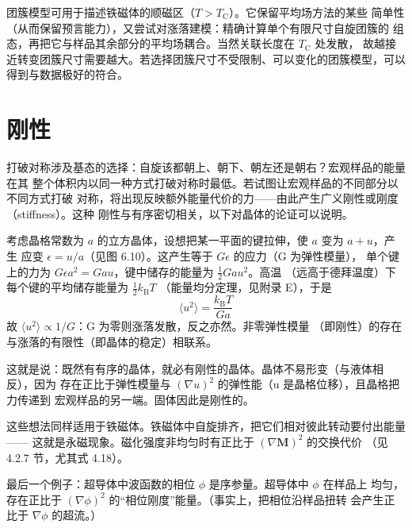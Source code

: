团簇模型可用于描述铁磁体的顺磁区（$T>T_{\mathrm{C}}$）。它保留平均场方法的某些
简单性（从而保留预言能力），又尝试对涨落建模：精确计算单个有限尺寸自旋团簇的
组态，再把它与样品其余部分的平均场耦合。当然关联长度在 $T_{\mathrm{C}}$ 处发散，
故越接近转变团簇尺寸需要越大。若选择团簇尺寸不受限制、可以变化的团簇模型，可以
得到与数据极好的符合。

\section{刚性}

打破对称涉及基态的选择：自旋该都朝上、朝下、朝左还是朝右？宏观样品的能量在其
整个体积内以同一种方式打破对称时最低。若试图让宏观样品的不同部分以不同方式打破
对称，将出现反映额外能量代价的力——由此产生广义刚性或刚度（stiffness）。这种
刚性与有序密切相关，以下对晶体的论证可以说明。

考虑晶格常数为 $a$ 的立方晶体，设想把某一平面的键拉伸，使 $a$ 变为 $a+u$，产生
应变 $\epsilon=u/a$（见图 6.10）。这产生等于 $G\epsilon$ 的应力（G 为弹性模量），
单个键上的力为 $G\epsilon a^{2}=Gau$，键中储存的能量为 $\frac{1}{2}Gau^{2}$。高温
（远高于德拜温度）下每个键的平均储存能量为 $\frac{1}{2}k_{\mathrm{B}}T$
（能量均分定理，见附录 E），于是
\begin{equation*}
\langle u^{2}\rangle = \frac{k_{\mathrm{B}}T}{Ga}\tag{6.8}
\end{equation*}
故 $\langle u^{2}\rangle\propto1/G$：G 为零则涨落发散，反之亦然。非零弹性模量
（即刚性）的存在与涨落的有限性（即晶体的稳定）相联系。

这就是说：既然有有序的晶体，就必有刚性的晶体。晶体不易形变（与液体相反），因为
存在正比于弹性模量与 $(\nabla u)^{2}$ 的弹性能（u 是晶格位移），且晶格把力传递到
宏观样品的另一端。固体因此是刚性的。

这些想法同样适用于铁磁体。铁磁体中自旋排齐，把它们相对彼此转动要付出能量——
这就是永磁现象。磁化强度非均匀时有正比于 $(\nabla\mathbf{M})^{2}$ 的交换代价
（见 4.2.7 节，尤其式 4.18）。

最后一个例子：超导体中波函数的相位 $\phi$ 是序参量。超导体中 $\phi$ 在样品上
均匀，存在正比于 $(\nabla\phi)^{2}$ 的“相位刚度”能量。（事实上，把相位沿样品扭转
会产生正比于 $\nabla\phi$ 的超流。）

